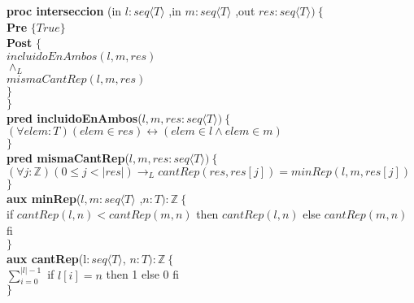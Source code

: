 \documentclass[a4paper]{article}
\begin{document}
			\textbf{proc interseccion }(in $l:seq\langle T\rangle$
				,in $m:seq\langle T\rangle$
				,out $res:seq\langle T\rangle )\ \{$\smallskip \\
			\hspace*{6mm} \textbf{Pre }$\{ True\}$\smallskip \\
			\hspace*{6mm} \textbf{Post }$\{$\\
			\hspace*{6mm} $incluidoEnAmbos(l,m,res)$\\
			\hspace*{6mm} $\wedge_L$\\
			\hspace*{6mm} $mismaCantRep(l,m,res)$\\
			\hspace*{6mm} $\}$\\
			\hspace*{5mm}$\}$\smallskip \\
			
			\textbf{pred incluidoEnAmbos}($l,m,res:seq\langle T\rangle)
			\ \{$\smallskip \\
			\hspace*{6mm}$ (\forall elem:T)(elem\in res) \leftrightarrow (elem\in l \wedge 
			elem\in m)$\\
			\hspace*{5mm}$\}$\smallskip \\	
			
			\textbf{pred mismaCantRep}($l,m,res:seq\langle T\rangle)
			\ \{$\smallskip \\
			\hspace*{6mm}$(\forall j:\mathbb{Z})(0\leq j<|res|)\rightarrow_L
			cantRep(res,res[j])=minRep(l,m,res[j])$\\
			\hspace*{5mm}$\}$\smallskip \\	
			
			\textbf{aux minRep}($l,m:seq\langle T\rangle$
				,$n:T ):\mathbb{Z}\ \{$\smallskip \\
			\hspace*{6mm}if $cantRep(l,n)<cantRep(m,n)$
				 then $cantRep(l,n)$ else $cantRep(m,n)$ fi\\
			\hspace*{5mm}$\}$\smallskip \\			
			
			\textbf{aux cantRep}(l$: seq\langle T\rangle$, $n:T):\mathbb{Z}
			\ \{$\smallskip \\
			\hspace*{6mm}$\sum_{i=0}^{|l|-1}$ if $l[i]=n$ then 1 else 0 fi\\
			\hspace*{5mm}$\}$\smallskip \\	
\end{document}
